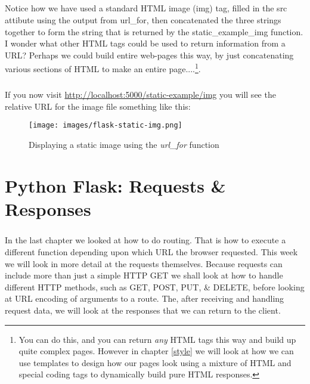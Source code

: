 \documentclass[12pt, a4paper, twoside]{book}
\begin{document}
\paragraph{} Notice how we have used a standard HTML image (img) tag, filled in the src attibute using the output from url\_for, then concatenated the three strings together to form the string that is returned by the static\_example\_img function. I wonder what other HTML tags could be used to return information from a URL? Perhaps we could build entire web-pages this way, by just concatenating various sections of HTML to make an entire page....\footnote{You can do this, and you can return \emph{any} HTML tags this way and build up quite complex pages. However in chapter \ref{style} we will look at how we can use templates to design how our pages look using a mixture of HTML and special coding tags to dynamically build pure HTML responses.}.

\paragraph{} If you now visit \url{http://localhost:5000/static-example/img} you will see the relative URL for the image file something like this:

\begin{figure}[H]
\centering
\texttt{[image: images/flask-static-img.png]}
\caption{Displaying a static image using the \emph{url\_for} function}
\label{fig:flask-static-img}
\end{figure}



\chapter{Python Flask: Requests \& Responses}
\label{lab04}
\paragraph{} In the last chapter we looked at how to do routing. That is how to execute a different function depending upon which URL the browser requested. This week we will look in more detail at the requests themselves. Because requests can include more than just a simple HTTP GET we shall look at how to handle different HTTP methods, such as GET, POST, PUT, \& DELETE, before looking at URL encoding of arguments to a route. The, after receiving and handling request data, we will look at the responses that we can return to the client.
\end{document}
